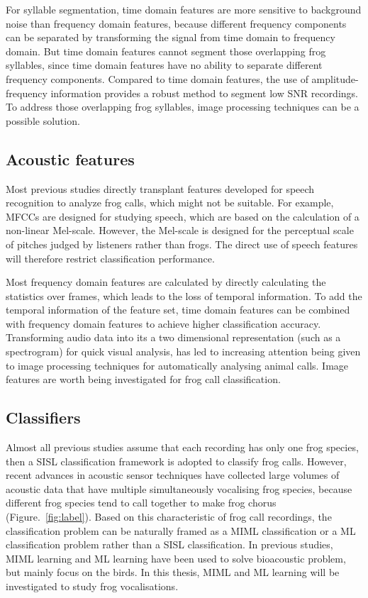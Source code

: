 For syllable segmentation, time domain features are more sensitive to background noise than frequency domain features, because different frequency components can be separated by transforming the signal from time domain to frequency domain. But time domain features cannot segment those overlapping frog syllables, since time domain features have no ability to separate different frequency components. Compared to time domain features, the use of amplitude-frequency information provides a robust method to segment low SNR recordings. To address those overlapping frog syllables, image processing techniques can be a possible solution. 




\subsection{Acoustic features}
Most previous studies directly transplant features developed for speech recognition to analyze frog calls, which might not be suitable. For example, MFCCs are designed for studying speech, which are based on the calculation of a non-linear Mel-scale. However, the Mel-scale is designed for the perceptual scale of pitches judged by listeners rather than frogs. The direct use of speech features will therefore restrict classification performance. 

Most frequency domain features are calculated by directly calculating the statistics over frames, which leads to the loss of temporal information. To add the temporal information of the feature set, time domain features can be combined with frequency domain features to achieve higher classification accuracy. Transforming audio data into its a two dimensional representation (such as a spectrogram) for quick visual analysis, has led to increasing attention being given to image processing techniques for automatically analysing animal calls. Image features are worth being investigated for frog call classification.

\subsection{Classifiers}
Almost all previous studies assume that each recording has only one frog species, then a SISL classification framework is adopted to classify frog calls. However, recent advances in acoustic sensor techniques have collected large volumes of acoustic data that have multiple simultaneously vocalising frog species, because different frog species tend to call together to make frog chorus (Figure.~\ref{fig:label}). Based on this characteristic of frog call recordings, the classification problem can be naturally framed as a MIML classification or a ML classification problem rather than a SISL classification.
In previous studies, MIML learning and ML learning have been used to solve bioacoustic problem, but mainly focus on the birds. In this thesis, MIML and ML learning will be investigated to study frog vocalisations.





